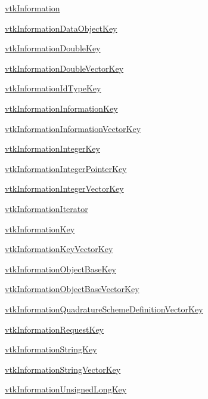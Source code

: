 \begin{DoxyItemize}
\item \hyperlink{vtkcommon_vtkinformation}{vtk\-Information}  
\item \hyperlink{vtkcommon_vtkinformationdataobjectkey}{vtk\-Information\-Data\-Object\-Key}  
\item \hyperlink{vtkcommon_vtkinformationdoublekey}{vtk\-Information\-Double\-Key}  
\item \hyperlink{vtkcommon_vtkinformationdoublevectorkey}{vtk\-Information\-Double\-Vector\-Key}  
\item \hyperlink{vtkcommon_vtkinformationidtypekey}{vtk\-Information\-Id\-Type\-Key}  
\item \hyperlink{vtkcommon_vtkinformationinformationkey}{vtk\-Information\-Information\-Key}  
\item \hyperlink{vtkcommon_vtkinformationinformationvectorkey}{vtk\-Information\-Information\-Vector\-Key}  
\item \hyperlink{vtkcommon_vtkinformationintegerkey}{vtk\-Information\-Integer\-Key}  
\item \hyperlink{vtkcommon_vtkinformationintegerpointerkey}{vtk\-Information\-Integer\-Pointer\-Key}  
\item \hyperlink{vtkcommon_vtkinformationintegervectorkey}{vtk\-Information\-Integer\-Vector\-Key}  
\item \hyperlink{vtkcommon_vtkinformationiterator}{vtk\-Information\-Iterator}  
\item \hyperlink{vtkcommon_vtkinformationkey}{vtk\-Information\-Key}  
\item \hyperlink{vtkcommon_vtkinformationkeyvectorkey}{vtk\-Information\-Key\-Vector\-Key}  
\item \hyperlink{vtkcommon_vtkinformationobjectbasekey}{vtk\-Information\-Object\-Base\-Key}  
\item \hyperlink{vtkcommon_vtkinformationobjectbasevectorkey}{vtk\-Information\-Object\-Base\-Vector\-Key}  
\item \hyperlink{vtkcommon_vtkinformationquadratureschemedefinitionvectorkey}{vtk\-Information\-Quadrature\-Scheme\-Definition\-Vector\-Key}  
\item \hyperlink{vtkcommon_vtkinformationrequestkey}{vtk\-Information\-Request\-Key}  
\item \hyperlink{vtkcommon_vtkinformationstringkey}{vtk\-Information\-String\-Key}  
\item \hyperlink{vtkcommon_vtkinformationstringvectorkey}{vtk\-Information\-String\-Vector\-Key}  
\item \hyperlink{vtkcommon_vtkinformationunsignedlongkey}{vtk\-Information\-Unsigned\-Long\-Key}  

\end{DoxyItemize}
